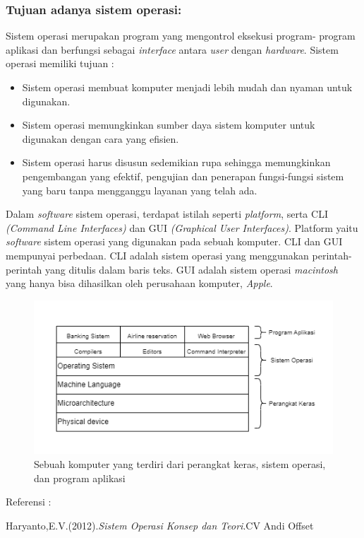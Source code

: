 \documentclass[12pt]{article}
\begin{document}
\subsubsection *{Tujuan adanya sistem operasi:}
Sistem operasi merupakan program yang mengontrol eksekusi program- program aplikasi dan berfungsi sebagai \textit{interface} antara \textit{user} dengan \textit{hardware}. Sistem operasi memiliki tujuan :
\begin{itemize}
    \item Sistem operasi membuat komputer menjadi lebih mudah dan nyaman untuk digunakan.
    \item Sistem operasi memungkinkan sumber daya sistem komputer untuk digunakan dengan cara yang efisien.
    \item Sistem operasi harus disusun sedemikian rupa sehingga memungkinkan pengembangan yang efektif, pengujian dan penerapan fungsi-fungsi sistem yang baru tanpa mengganggu layanan yang telah ada.
\end{itemize}
Dalam \textit{software} sistem operasi, terdapat istilah seperti \textit{platform}, serta CLI \textit{(Command Line Interfaces)} dan GUI \textit{(Graphical User Interfaces)}. Platform yaitu \textit{software} sistem operasi yang digunakan pada sebuah komputer. CLI dan GUI mempunyai perbedaan. CLI adalah sistem operasi yang menggunakan perintah-perintah yang ditulis dalam baris teks. GUI adalah sistem operasi \textit{macintosh} yang hanya bisa dihasilkan oleh perusahaan komputer, \textit{Apple}.
\begin{figure}[h]
		\centering
		\includegraphics[width=1\textwidth]{asset/sistemoperasi.png}
		\caption{Sebuah komputer yang terdiri dari perangkat keras, sistem operasi, dan program aplikasi} 
		\label{fig:contoh_gambar}
	\end{figure}
    \item Referensi :
    \item Haryanto,E.V.(2012).\textit{Sistem Operasi Konsep dan Teori}.CV Andi Offset
\end{document}
